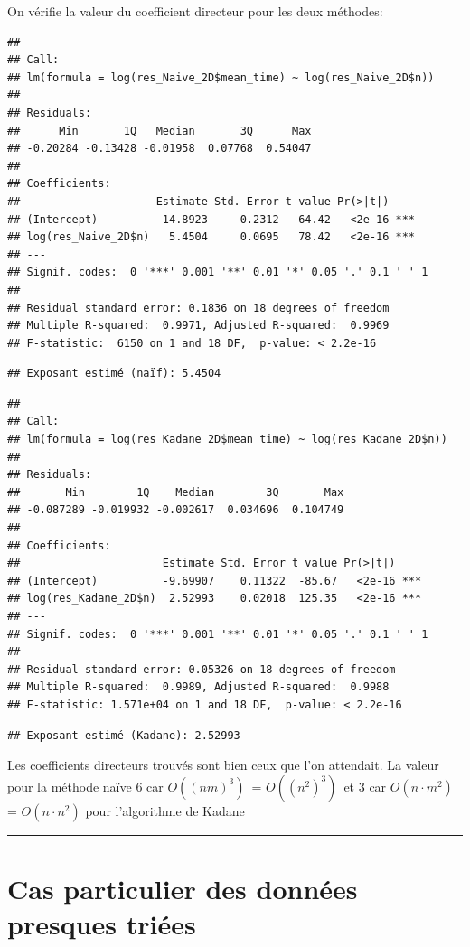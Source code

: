 \documentclass[
]{article}
\begin{document}
On vérifie la valeur du coefficient directeur pour les deux méthodes:

\begin{verbatim}
## 
## Call:
## lm(formula = log(res_Naive_2D$mean_time) ~ log(res_Naive_2D$n))
## 
## Residuals:
##      Min       1Q   Median       3Q      Max 
## -0.20284 -0.13428 -0.01958  0.07768  0.54047 
## 
## Coefficients:
##                     Estimate Std. Error t value Pr(>|t|)    
## (Intercept)         -14.8923     0.2312  -64.42   <2e-16 ***
## log(res_Naive_2D$n)   5.4504     0.0695   78.42   <2e-16 ***
## ---
## Signif. codes:  0 '***' 0.001 '**' 0.01 '*' 0.05 '.' 0.1 ' ' 1
## 
## Residual standard error: 0.1836 on 18 degrees of freedom
## Multiple R-squared:  0.9971, Adjusted R-squared:  0.9969 
## F-statistic:  6150 on 1 and 18 DF,  p-value: < 2.2e-16
\end{verbatim}

\begin{verbatim}
## Exposant estimé (naïf): 5.4504
\end{verbatim}

\begin{verbatim}
## 
## Call:
## lm(formula = log(res_Kadane_2D$mean_time) ~ log(res_Kadane_2D$n))
## 
## Residuals:
##       Min        1Q    Median        3Q       Max 
## -0.087289 -0.019932 -0.002617  0.034696  0.104749 
## 
## Coefficients:
##                      Estimate Std. Error t value Pr(>|t|)    
## (Intercept)          -9.69907    0.11322  -85.67   <2e-16 ***
## log(res_Kadane_2D$n)  2.52993    0.02018  125.35   <2e-16 ***
## ---
## Signif. codes:  0 '***' 0.001 '**' 0.01 '*' 0.05 '.' 0.1 ' ' 1
## 
## Residual standard error: 0.05326 on 18 degrees of freedom
## Multiple R-squared:  0.9989, Adjusted R-squared:  0.9988 
## F-statistic: 1.571e+04 on 1 and 18 DF,  p-value: < 2.2e-16
\end{verbatim}

\begin{verbatim}
## Exposant estimé (Kadane): 2.52993
\end{verbatim}

Les coefficients directeurs trouvés sont bien ceux que l'on attendait.
La valeur pour la méthode naïve 6 car \(O\left((nm)^3\right)\)~=
\(O\left((n^2)^3\right)\)~et 3 car \(O(n \cdot m^2)\) =
\(O(n \cdot n^2)\) pour l'algorithme de Kadane

\begin{center}\rule{0.5\linewidth}{0.5pt}\end{center}

\section{Cas particulier des données presques
triées}\label{cas-particulier-des-donnuxe9es-presques-triuxe9es}
\end{document}
